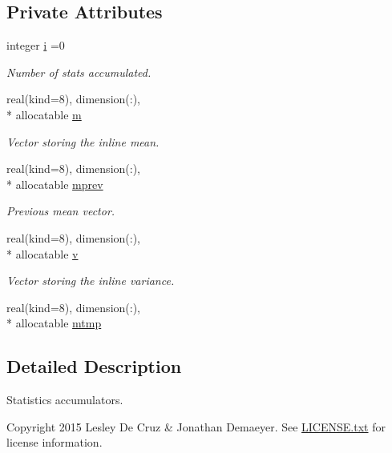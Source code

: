 \subsection*{Private Attributes}
\begin{DoxyCompactItemize}
\item 
integer \hyperlink{classstat_aae82ae81e5eb5620583fec6c93aa6fa3}{i} =0
\begin{DoxyCompactList}\small\item\em Number of stats accumulated. \end{DoxyCompactList}\item 
real(kind=8), dimension(\-:), \\*
allocatable \hyperlink{classstat_a2416f75ad24ac05a0ba615f9c8d467db}{m}
\begin{DoxyCompactList}\small\item\em Vector storing the inline mean. \end{DoxyCompactList}\item 
real(kind=8), dimension(\-:), \\*
allocatable \hyperlink{classstat_adcf5178f8d91cdc53ff5f28cc3e04689}{mprev}
\begin{DoxyCompactList}\small\item\em Previous mean vector. \end{DoxyCompactList}\item 
real(kind=8), dimension(\-:), \\*
allocatable \hyperlink{classstat_ab2a3ce8c90189fdbd6bb313c75876473}{v}
\begin{DoxyCompactList}\small\item\em Vector storing the inline variance. \end{DoxyCompactList}\item 
real(kind=8), dimension(\-:), \\*
allocatable \hyperlink{classstat_a24c9afb1c1c6692185b509fd364508c8}{mtmp}
\end{DoxyCompactItemize}


\subsection{Detailed Description}
Statistics accumulators. 

\begin{DoxyCopyright}{Copyright}
2015 Lesley De Cruz \& Jonathan Demaeyer. See \hyperlink{LICENSE_8txt}{L\-I\-C\-E\-N\-S\-E.\-txt} for license information. 
\end{DoxyCopyright}


